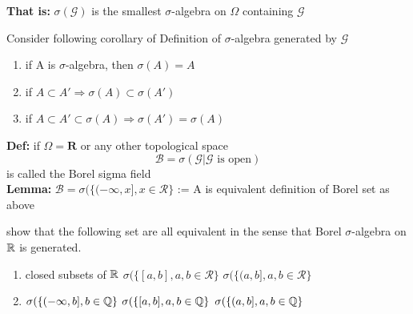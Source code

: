 \textbf{That is: }$\sigma(\mathcal{G})$ is the smallest $\sigma$-algebra on $\Omega$ containing $\mathcal{G}$ \pf \\[8cm]
\begin{ex} Consider following corollary of Definition of $\sigma$-algebra generated by $\mathcal{G}$ 
\begin{enumerate}
    \item if A is $\sigma$-algebra, then $\sigma(A) = A$
    \item if $A\subset A' \Rightarrow \sigma(A)\subset\sigma(A')$
    \item if $A\subset A' \subset \sigma(A) \Rightarrow \sigma(A') =\sigma(A)$
\end{enumerate}
\end{ex}
\newpage
\textbf{Def:} if $\Omega = \mathbf{R}$ or any other topological space
\begin{equation*}
    \mathcal{B} = \sigma(\mathcal{G}|\mathcal{G} \text{ is open})
\end{equation*}
is called the Borel sigma field \\
\textbf{Lemma:} $\mathcal{B} = \sigma(\{(-\infty, x], x\in \mathcal{R}\}$  := A is equivalent definition of Borel set as above \\[10cm]
\begin{ex}
show that the following set are all equivalent in the sense that Borel $\sigma$-algebra on $\mathbb{R}$ is generated.
\begin{enumerate}
    \item closed subsets of $\mathbb{R}$
    \inlineitem $\sigma(\{[a, b], a,b\in \mathcal{R}\}$
    \inlineitem $\sigma(\{(a, b], a,b\in \mathcal{R}\}$
    \item $\sigma(\{(-\infty, b], b\in \mathbb{Q}\}$
    \inlineitem $\sigma(\{[a, b], a,b\in \mathbb{Q}\}$
    \inlineitem $\sigma(\{(a, b], a,b\in \mathbb{Q}\}$
\end{enumerate}
\end{ex}